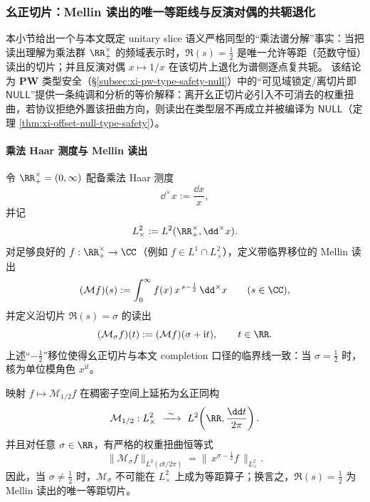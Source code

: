 
\subsubsection{幺正切片：Mellin 读出的唯一等距线与反演对偶的共轭退化}\label{subsubsec:xi-mellin-unitary-slice}

本小节给出一个与本文既定 unitary slice 语义严格同型的“乘法谱分解”事实：当把读出理解为乘法群 \(\RR_{+}^{\times}\) 的频域表示时，\(\Re(s)=\tfrac12\) 是唯一允许等距（范数守恒）读出的切片；并且反演对偶 \(x\mapsto 1/x\) 在该切片上退化为谱侧逐点复共轭。
该结论为 \(\mathbf{PW}\) 类型安全（\S\ref{subsec:xi-pw-type-safety-null}）中的“可见域锁定/离切片即 \(\mathsf{NULL}\)”提供一条纯调和分析的等价解释：离开幺正切片必引入不可消去的权重扭曲，若协议拒绝外置该扭曲方向，则读出在类型层不再成立并被编译为 \(\mathsf{NULL}\)（定理 \ref{thm:xi-offset-null-type-safety}）。

\paragraph{乘法 Haar 测度与 Mellin 读出}
令 \(\RR_{+}^{\times}=(0,\infty)\) 配备乘法 Haar 测度
\[
\dd^{\times}x:=\frac{\dd x}{x},
\]
并记
\[
L^{2}_{\times}:=L^{2}(\RR_{+}^{\times},\dd^{\times}x).
\]
对足够良好的 \(f:\RR_{+}^{\times}\to\CC\)（例如 \(f\in L^{1}\cap L^{2}_{\times}\)），定义带临界移位的 Mellin 读出
\begin{equation}\label{eq:mellin-shifted-readout}
(\mathcal{M}f)(s):=\int_{0}^{\infty} f(x)\,x^{\,s-\frac12}\,\dd^{\times}x
\qquad(s\in\CC),
\end{equation}
并定义沿切片 \(\Re(s)=\sigma\) 的读出
\[
(\mathcal{M}_{\sigma}f)(t):=(\mathcal{M}f)(\sigma+\mathrm{i}t),\qquad t\in\RR.
\]
上述“\(-\tfrac12\)”移位使得幺正切片与本文 completion 口径的临界线一致：当 \(\sigma=\tfrac12\) 时，核为单位模角色 \(x^{\mathrm{i}t}\)。

\begin{theorem}\label{thm:mellin-unitary-slice-unique}
映射 \(f\mapsto \mathcal{M}_{1/2}f\) 在稠密子空间上延拓为幺正同构
\[
\mathcal{M}_{1/2}:L^{2}_{\times}\ \xrightarrow{\ \sim\ }\ L^{2}\!\left(\RR,\frac{\dd t}{2\pi}\right).
\]
并且对任意 \(\sigma\in\RR\)，有严格的权重扭曲恒等式
\begin{equation}\label{eq:mellin-sigma-weight-twist}
\|\mathcal{M}_{\sigma}f\|_{L^{2}(\dd t/2\pi)}
=
\|\,x^{\sigma-\frac12}f\,\|_{L^{2}_{\times}}.
\end{equation}
因此，当 \(\sigma\neq\tfrac12\) 时，\(\mathcal{M}_{\sigma}\) 不可能在 \(L^{2}_{\times}\) 上成为等距算子；换言之，\(\Re(s)=\tfrac12\) 为 Mellin 读出的唯一等距切片。
\end{theorem}

